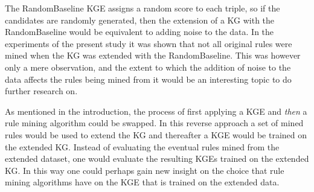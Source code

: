 The RandomBaseline KGE assigns a random score to each triple, so if the candidates are randomly generated, then the extension of a KG with the RandomBaseline would be equivalent to adding noise to the data. In the experiments of the present study it was shown that not all original rules were mined when the KG was extended with the RandomBaseline. This was however only a mere observation, and the extent to which the addition of noise to the data affects the rules being mined from it would be an interesting topic to do further research on.

As mentioned in the introduction, the process of first applying a KGE and \textit{then} a rule mining algorithm could be swapped. In this reverse approach a set of mined rules would be used to extend the KG and thereafter a KGE would be trained on the extended KG. Instead of evaluating the eventual rules mined from the extended dataset, one would evaluate the resulting KGEs trained on the extended KG. In this way one could perhaps gain new insight on the choice that rule mining algorithms have on the KGE that is trained on the extended data.